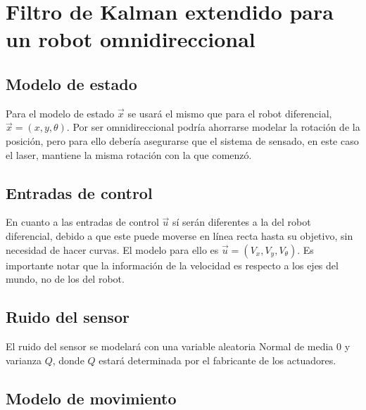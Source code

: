 \documentclass[a4paper]{article}
\theoremstyle{plain}
\theoremstyle{remark}
\theoremstyle{definition}
\begin{document}

\maketitle
\thispagestyle{empty}

\section{Filtro de Kalman extendido para un robot omnidireccional}

\subsection*{Modelo de estado}

Para el modelo de estado $\vec{x}$ se usará el mismo que para el robot diferencial, $\vec{x} = (x, y, \theta)$. Por ser omnidireccional podría ahorrarse modelar la rotación de la posición, pero para ello debería asegurarse que el sistema de sensado, en este caso el laser, mantiene la misma rotación con la que comenzó.

\subsection*{Entradas de control}

En cuanto a las entradas de control $\vec{u}$ sí serán diferentes a la del robot diferencial, debido a que este puede moverse en línea recta hasta su objetivo, sin necesidad de hacer curvas. El modelo para ello es $\vec{u} = (V_x, V_y, V_{\theta})$. Es importante notar que la información de la velocidad es respecto a los ejes del mundo, no de los del robot.

\subsection*{Ruido del sensor}

El ruido del sensor se modelará con una variable aleatoria Normal de media 0 y varianza $Q$, donde $Q$ estará determinada por el fabricante de los actuadores.

\subsection*{Modelo de movimiento}
\end{document}
